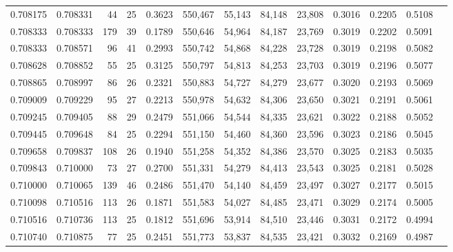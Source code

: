 \begin{tabular}{rrrrrrrrrrrrr}
0.708175 & 0.708331 &     44 &    25 &                                     0.3623 & 550,467 &  55,143 &  84,148 &  23,808 & 0.3016 & 0.2205 & 0.5108 \\
0.708333 & 0.708333 &    179 &    39 &                                     0.1789 & 550,646 &  54,964 &  84,187 &  23,769 & 0.3019 & 0.2202 & 0.5091 \\
0.708333 & 0.708571 &     96 &    41 &                                     0.2993 & 550,742 &  54,868 &  84,228 &  23,728 & 0.3019 & 0.2198 & 0.5082 \\
0.708628 & 0.708852 &     55 &    25 &                                     0.3125 & 550,797 &  54,813 &  84,253 &  23,703 & 0.3019 & 0.2196 & 0.5077 \\
0.708865 & 0.708997 &     86 &    26 &                                     0.2321 & 550,883 &  54,727 &  84,279 &  23,677 & 0.3020 & 0.2193 & 0.5069 \\
0.709009 & 0.709229 &     95 &    27 &                                     0.2213 & 550,978 &  54,632 &  84,306 &  23,650 & 0.3021 & 0.2191 & 0.5061 \\
0.709245 & 0.709405 &     88 &    29 &                                     0.2479 & 551,066 &  54,544 &  84,335 &  23,621 & 0.3022 & 0.2188 & 0.5052 \\
0.709445 & 0.709648 &     84 &    25 &                                     0.2294 & 551,150 &  54,460 &  84,360 &  23,596 & 0.3023 & 0.2186 & 0.5045 \\
0.709658 & 0.709837 &    108 &    26 &                                     0.1940 & 551,258 &  54,352 &  84,386 &  23,570 & 0.3025 & 0.2183 & 0.5035 \\
0.709843 & 0.710000 &     73 &    27 &                                     0.2700 & 551,331 &  54,279 &  84,413 &  23,543 & 0.3025 & 0.2181 & 0.5028 \\
0.710000 & 0.710065 &    139 &    46 &                                     0.2486 & 551,470 &  54,140 &  84,459 &  23,497 & 0.3027 & 0.2177 & 0.5015 \\
0.710098 & 0.710516 &    113 &    26 &                                     0.1871 & 551,583 &  54,027 &  84,485 &  23,471 & 0.3029 & 0.2174 & 0.5005 \\
0.710516 & 0.710736 &    113 &    25 &                                     0.1812 & 551,696 &  53,914 &  84,510 &  23,446 & 0.3031 & 0.2172 & 0.4994 \\
0.710740 & 0.710875 &     77 &    25 &                                     0.2451 & 551,773 &  53,837 &  84,535 &  23,421 & 0.3032 & 0.2169 & 0.4987 \\

\end{tabular}
